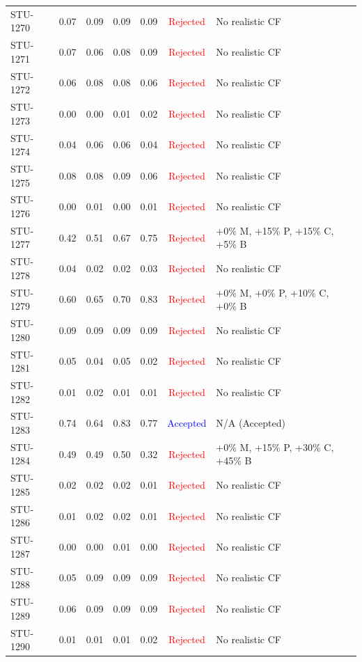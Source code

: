 \begin{longtable}{l c c c c | c | l}
STU-1270 & 0.07 & 0.09 & 0.09 & 0.09 & \textcolor{red}{Rejected} & No realistic CF \\
STU-1271 & 0.07 & 0.06 & 0.08 & 0.09 & \textcolor{red}{Rejected} & No realistic CF \\
STU-1272 & 0.06 & 0.08 & 0.08 & 0.06 & \textcolor{red}{Rejected} & No realistic CF \\
STU-1273 & 0.00 & 0.00 & 0.01 & 0.02 & \textcolor{red}{Rejected} & No realistic CF \\
STU-1274 & 0.04 & 0.06 & 0.06 & 0.04 & \textcolor{red}{Rejected} & No realistic CF \\
STU-1275 & 0.08 & 0.08 & 0.09 & 0.06 & \textcolor{red}{Rejected} & No realistic CF \\
STU-1276 & 0.00 & 0.01 & 0.00 & 0.01 & \textcolor{red}{Rejected} & No realistic CF \\
STU-1277 & 0.42 & 0.51 & 0.67 & 0.75 & \textcolor{red}{Rejected} & +0\% M, +15\% P, +15\% C, +5\% B \\
STU-1278 & 0.04 & 0.02 & 0.02 & 0.03 & \textcolor{red}{Rejected} & No realistic CF \\
STU-1279 & 0.60 & 0.65 & 0.70 & 0.83 & \textcolor{red}{Rejected} & +0\% M, +0\% P, +10\% C, +0\% B \\
STU-1280 & 0.09 & 0.09 & 0.09 & 0.09 & \textcolor{red}{Rejected} & No realistic CF \\
STU-1281 & 0.05 & 0.04 & 0.05 & 0.02 & \textcolor{red}{Rejected} & No realistic CF \\
STU-1282 & 0.01 & 0.02 & 0.01 & 0.01 & \textcolor{red}{Rejected} & No realistic CF \\
STU-1283 & 0.74 & 0.64 & 0.83 & 0.77 & \textcolor{blue}{Accepted} & N/A (Accepted) \\
STU-1284 & 0.49 & 0.49 & 0.50 & 0.32 & \textcolor{red}{Rejected} & +0\% M, +15\% P, +30\% C, +45\% B \\
STU-1285 & 0.02 & 0.02 & 0.02 & 0.01 & \textcolor{red}{Rejected} & No realistic CF \\
STU-1286 & 0.01 & 0.02 & 0.02 & 0.01 & \textcolor{red}{Rejected} & No realistic CF \\
STU-1287 & 0.00 & 0.00 & 0.01 & 0.00 & \textcolor{red}{Rejected} & No realistic CF \\
STU-1288 & 0.05 & 0.09 & 0.09 & 0.09 & \textcolor{red}{Rejected} & No realistic CF \\
STU-1289 & 0.06 & 0.09 & 0.09 & 0.09 & \textcolor{red}{Rejected} & No realistic CF \\
STU-1290 & 0.01 & 0.01 & 0.01 & 0.02 & \textcolor{red}{Rejected} & No realistic CF \\

\end{longtable}
